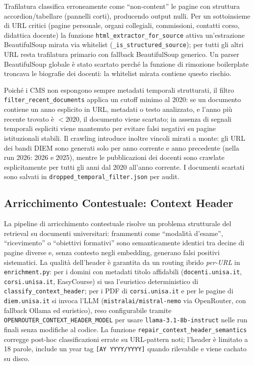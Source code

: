 \documentclass[11pt,a4paper]{article}
\newcommand{\code}[1]{\texttt{\small#1}}
\begin{document}
Trafilatura classifica erroneamente come ``non-content'' le pagine con struttura
accordion/tabellare (pannelli corti), producendo output nulli. Per un sottoinsieme di URL
critici (pagine personale, organi collegiali, commissioni, contatti corso, didattica
docente) la funzione \code{html\_extractor\_for\_source} attiva un'estrazione BeautifulSoup
mirata via whitelist (\code{\_is\_structured\_source}); per tutti gli altri URL resta
trafilatura primario con fallback BeautifulSoup generico. Un parser BeautifulSoup globale è
stato scartato perché la funzione di rimozione boilerplate troncava le biografie dei
docenti: la whitelist mirata contiene questo rischio.

Poiché i CMS non espongono sempre metadati temporali strutturati, il filtro
\code{filter\_recent\_documents} applica un cutoff minimo al 2020: se un documento contiene
un anno esplicito in URL, metadati o testo analizzato, e l'anno più recente trovato è
$<2020$, il documento viene scartato; in assenza di segnali temporali espliciti viene
mantenuto per evitare falsi negativi su pagine istituzionali stabili. Il crawling introduce
inoltre vincoli mirati a monte: gli URL dei bandi DIEM sono generati solo per anno corrente
e anno precedente (nella run 2026: 2026 e 2025), mentre le pubblicazioni dei docenti sono
crawlate esplicitamente per tutti gli anni dal 2020 all'anno corrente. I documenti scartati
sono salvati in \texttt{dropped\_temporal\_filter.json} per audit.

\subsection{Arricchimento Contestuale: Context Header}
\label{sec:enrichment}

La pipeline di arricchimento contestuale risolve un problema strutturale del retrieval su
documenti universitari: frammenti come ``modalità d'esame'', ``ricevimento'' o ``obiettivi
formativi'' sono semanticamente identici tra decine di pagine diverse e, senza contesto
negli embedding, generano falsi positivi sistematici. La qualità dell'header è garantita
da un routing ibrido \emph{per-URL} in \code{enrichment.py}: per i domini con metadati
titolo affidabili (\texttt{docenti.unisa.it}, \texttt{corsi.unisa.it}, EasyCourse) si usa
l'euristico deterministico di \code{classify\_context\_header}; per i PDF di
\texttt{corsi.unisa.it} e per le pagine di \texttt{diem.unisa.it} si invoca l'LLM
(\code{mistralai/mistral-nemo} via OpenRouter, con fallback Ollama ed euristico), reso
configurabile tramite \code{OPENROUTER\_CONTEXT\_HEADER\_MODEL} per usare
\code{llama-3.1-8b-instruct} nelle run finali senza modifiche al codice. La funzione
\code{repair\_context\_header\_semantics} corregge post-hoc classificazioni errate su
URL-pattern noti; l'header è limitato a 18 parole, include un year tag
\texttt{[AY YYYY/YYYY]} quando rilevabile e viene cachato su disco.
\end{document}
